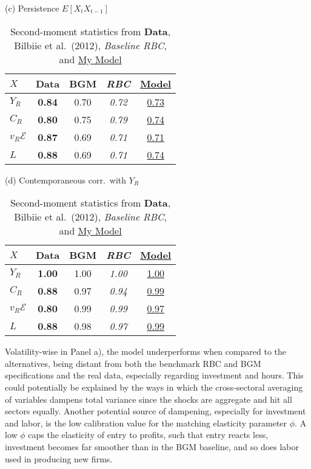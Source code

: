 \documentclass[a4paper,12pt]{article} %
\numberwithin{equation}{section} %
\numberwithin{figure}{section}
\numberwithin{table}{section}
\newcommand{\dat}{\textbf}      %
\newcommand{\rbc}{\emph}        %
\newcommand{\mine}[1]{\underline{#1}}   %
\begin{document}
\begin{table}[H]
\begin{subtable}[t]{.48\textwidth}
  \centering
  \caption*{(c) Persistence $E[X_t X_{t-1}]$}
  \begin{tabular}{lcccc}
  \toprule
   $X$ & \dat{Data} & BGM & \rbc{RBC} & \mine{Model}\\
  \midrule
   $Y_R$      & \dat{0.84} & 0.70 & \rbc{0.72} & \mine{0.73}\\
   $C_R$      & \dat{0.80} & 0.75 & \rbc{0.79} & \mine{0.74}\\
   $v_R\mathcal{E}$   & \dat{0.87} & 0.69 & \rbc{0.71} & \mine{0.71}\\
   $L$        & \dat{0.88} & 0.69 & \rbc{0.71} & \mine{0.74}\\
  \bottomrule
  \end{tabular}
\end{subtable}
\hfill
\begin{subtable}[t]{.48\textwidth}
  \centering
  \caption*{(d) Contemporaneous corr.\ with $Y_R$}
  \begin{tabular}{lcccc}
  \toprule
   $X$ & \dat{Data} & BGM & \rbc{RBC} & \mine{Model}\\
  \midrule
   $Y_R$      & \dat{1.00} & 1.00 & \rbc{1.00} & \mine{1.00}\\
   $C_R$      & \dat{0.88} & 0.97 & \rbc{0.94} & \mine{0.99}\\
   $v_R\mathcal{E}$   & \dat{0.80} & 0.99 & \rbc{0.99} & \mine{0.97}\\
   $L$        & \dat{0.88} & 0.98 & \rbc{0.97} & \mine{0.99}\\
  \bottomrule
  \end{tabular}
\end{subtable}
\caption{Second-moment statistics from \dat{Data}, Bilbiie et al.\ (2012), 
\rbc{Baseline RBC}, and \mine{My Model}}
\label{tab:moments}
\end{table}

Volatility-wise in Panel a), the model underperforms when compared to the alternatives, being distant from both the
benchmark RBC and BGM specifications and the real data, especially regarding investment and hours. This could potentially
be explained by the ways in which the cross-sectoral averaging of variables dampens total variance since the shocks are aggregate and hit
all sectors equally. Another potential source of dampening, especially for investment and labor, is the low calibration value
for the matching elasticity parameter $\phi$. A low $\phi$ caps the elasticity of entry to profits, such that entry
reacts less, investment becomes far smoother than in the BGM baseline, and so does labor used in producing new firms. 
\end{document}
